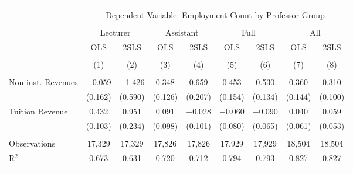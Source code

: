 
\begin{tabular}{@{\extracolsep{5pt}}lcccccccc} 
\\[-1.8ex]\hline 
\hline \\[-1.8ex] 
 & \multicolumn{8}{c}{Dependent Variable: Employment Count by Professor Group} \\ 
\cline{2-9} 
\\[-1.8ex] & \multicolumn{2}{c}{Lecturer} & \multicolumn{2}{c}{Assistant} & \multicolumn{2}{c}{Full} & \multicolumn{2}{c}{All} \\ 
 & OLS & 2SLS & OLS & 2SLS & OLS & 2SLS & OLS & 2SLS \\ 
\\[-1.8ex] & (1) & (2) & (3) & (4) & (5) & (6) & (7) & (8)\\ 
\hline \\[-1.8ex] 
 Non-inst. Revenues & $-$0.059 & $-$1.426 & 0.348 & 0.659 & 0.453 & 0.530 & 0.360 & 0.310 \\ 
  & (0.162) & (0.590) & (0.126) & (0.207) & (0.154) & (0.134) & (0.144) & (0.100) \\ 
  Tuition Revenue & 0.432 & 0.951 & 0.091 & $-$0.028 & $-$0.060 & $-$0.090 & 0.040 & 0.059 \\ 
  & (0.103) & (0.234) & (0.098) & (0.101) & (0.080) & (0.065) & (0.061) & (0.053) \\ 
 \hline \\[-1.8ex] 
Observations & 17,329 & 17,329 & 17,826 & 17,826 & 17,929 & 17,929 & 18,504 & 18,504 \\ 
R$^{2}$ & 0.673 & 0.631 & 0.720 & 0.712 & 0.794 & 0.793 & 0.827 & 0.827 \\ 
\hline 
\hline \\[-1.8ex] 
\end{tabular} 
